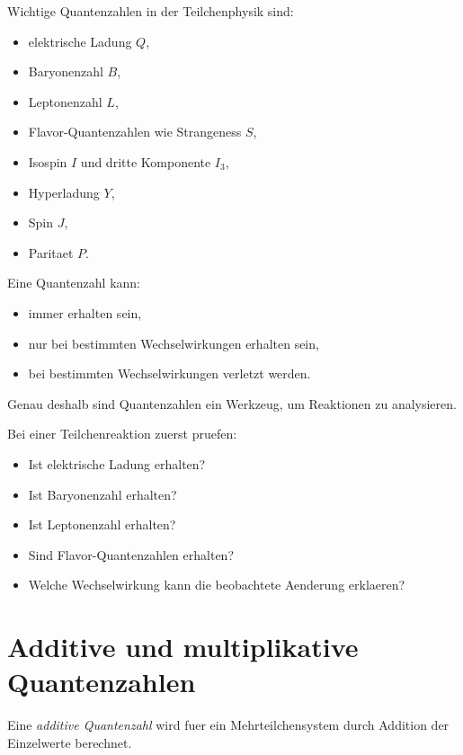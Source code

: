 \begin{conceptbox}
Wichtige Quantenzahlen in der Teilchenphysik sind:
\begin{itemize}
    \item elektrische Ladung $Q$,
    \item Baryonenzahl $B$,
    \item Leptonenzahl $L$,
    \item Flavor-Quantenzahlen wie Strangeness $S$,
    \item Isospin $I$ und dritte Komponente $I_3$,
    \item Hyperladung $Y$,
    \item Spin $J$,
    \item Paritaet $P$.
\end{itemize}
\end{conceptbox}

\begin{conceptbox}
Eine Quantenzahl kann:
\begin{itemize}
    \item immer erhalten sein,
    \item nur bei bestimmten Wechselwirkungen erhalten sein,
    \item bei bestimmten Wechselwirkungen verletzt werden.
\end{itemize}

Genau deshalb sind Quantenzahlen ein Werkzeug, um Reaktionen zu analysieren.
\end{conceptbox}

\begin{examtipbox}
Bei einer Teilchenreaktion zuerst pruefen:
\begin{itemize}
    \item Ist elektrische Ladung erhalten?
    \item Ist Baryonenzahl erhalten?
    \item Ist Leptonenzahl erhalten?
    \item Sind Flavor-Quantenzahlen erhalten?
    \item Welche Wechselwirkung kann die beobachtete Aenderung erklaeren?
\end{itemize}
\end{examtipbox}

\section{Additive und multiplikative Quantenzahlen}

\begin{definitionbox}
Eine \emph{additive Quantenzahl} wird fuer ein Mehrteilchensystem durch Addition
der Einzelwerte berechnet.
\end{definitionbox}

